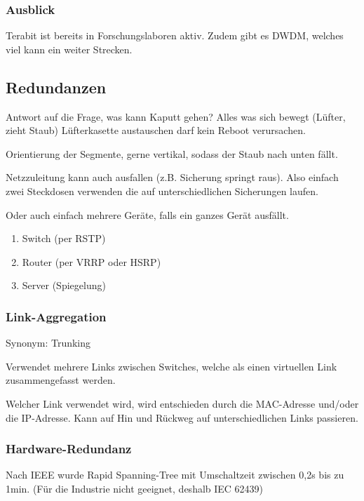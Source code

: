 \documentclass[a4paper]{article}
\begin{document}
\subsubsection{Ausblick}

Terabit ist bereits in Forschungslaboren aktiv. Zudem gibt es DWDM, welches viel kann ein weiter Strecken.

\subsection{Redundanzen}


Antwort auf die Frage, was kann Kaputt gehen? Alles was sich bewegt (Lüfter, zieht Staub) Lüfterkasette austauschen darf kein Reboot verursachen.

Orientierung der Segmente, gerne vertikal, sodass der Staub nach unten fällt.

Netzzuleitung kann auch ausfallen (z.B. Sicherung springt raus). Also einfach zwei Steckdosen verwenden die auf unterschiedlichen Sicherungen laufen.

Oder auch einfach mehrere Geräte, falls ein ganzes Gerät ausfällt. 

\begin{enumerate}
    \item Switch (per RSTP)
    \item Router (per VRRP oder HSRP)
    \item Server (Spiegelung)
\end{enumerate}

\subsubsection{Link-Aggregation}

Synonym: Trunking

Verwendet mehrere Links zwischen Switches, welche als einen virtuellen Link zusammengefasst werden.

Welcher Link verwendet wird, wird entschieden durch die MAC-Adresse und/oder die IP-Adresse. Kann auf Hin und Rückweg auf unterschiedlichen Links passieren.

\subsubsection{Hardware-Redundanz}

Nach IEEE wurde Rapid Spanning-Tree mit Umschaltzeit zwischen 0,2s bis zu 1min. (Für die Industrie nicht geeignet, deshalb IEC 62439)
\end{document}

